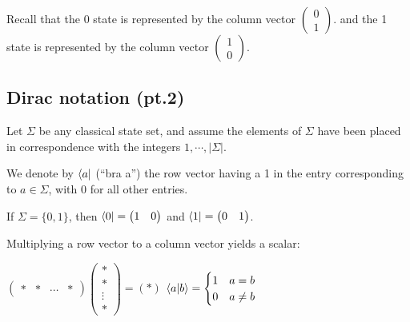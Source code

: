 \documentclass{report}
\begin{document}
\begin{note}
    Recall that the 0 state is represented by the column vector
    $\begin{pmatrix}
        0 \\
        1
    \end{pmatrix}$.
    and the 1 state is represented by the column vector
    $\begin{pmatrix}
        1 \\
        0
    \end{pmatrix}$.
\end{note}

\subsection{Dirac notation (pt.2)}
Let $\Sigma$ be any classical state set, and assume the elements of $\Sigma$ have been placed in correspondence with the integers $1,\cdots,|\Sigma|$.

\bigbreak

We denote by $\bra{a}$ (``bra a'') the row vector having a 1 in the entry corresponding to $a\in\Sigma$, with 0 for all other entries.

\bigbreak

If $\Sigma=\{0,1\}$, then $\bra{0}=
\begin{pmatrix}
    1 & 0
\end{pmatrix}$
and $\bra{1}=
\begin{pmatrix}
    0 & 1
\end{pmatrix}$.

\newpage

Multiplying a row vector to a column vector yields a scalar:
\begin{center}
    $\begin{pmatrix}
        * & * & \cdots & *
    \end{pmatrix}
    \begin{pmatrix}
        * \\
        * \\
        \vdots \\
        *
    \end{pmatrix}
    =
    (*)$
    \bigbreak
    $
    \braket{a|b}=
    \begin{cases}
    1 & a=b \\
    0 & a\neq b
    \end{cases}$
\end{center}
\end{document}
